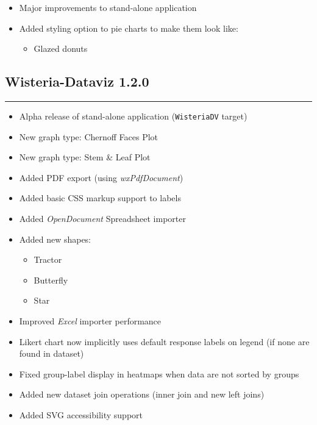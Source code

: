 \documentclass[
]{scrartcl}
\providecommand{\tightlist}{%
  \setlength{\itemsep}{0pt}\setlength{\parskip}{0pt}}
\begin{document}
\begin{itemize}
\tightlist
\item
  Major improvements to stand-alone application
\item
  Added styling option to pie charts to make them look like:

  \begin{itemize}
  \tightlist
  \item
    Glazed donuts
  \end{itemize}
\end{itemize}

\subsection*{Wisteria-Dataviz 1.2.0}\label{section-3}

\begin{center}\rule{0.5\linewidth}{0.5pt}\end{center}

\begin{itemize}
\tightlist
\item
  Alpha release of stand-alone application (\texttt{WisteriaDV} target)
\item
  New graph type: Chernoff Faces Plot
\item
  New graph type: Stem \& Leaf Plot
\item
  Added PDF export (using \emph{wxPdfDocument})
\item
  Added basic CSS markup support to labels
\item
  Added \emph{OpenDocument} Spreadsheet importer
\item
  Added new shapes:

  \begin{itemize}
  \tightlist
  \item
    Tractor
  \item
    Butterfly
  \item
    Star
  \end{itemize}
\item
  Improved \emph{Excel} importer performance
\item
  Likert chart now implicitly uses default response labels on legend (if
  none are found in dataset)
\item
  Fixed group-label display in heatmaps when data are not sorted by
  groups
\item
  Added new dataset join operations (inner join and new left joins)
\item
  Added SVG accessibility support
\end{itemize}
\end{document}

